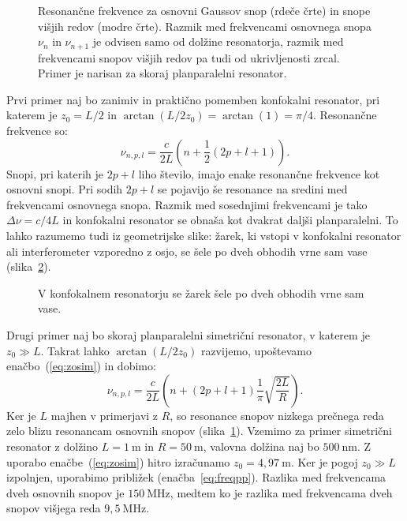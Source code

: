 \begin{figure}[ht]
\centering
\def\svgwidth{110truemm} 

\caption{Resonančne frekvence za osnovni Gaussov snop (rdeče črte) in snope višjih redov
(modre črte). Razmik med frekvencami osnovnega snopa $\nu_n$ in $\nu_{n+1}$ je odvisen 
samo od dolžine resonatorja, razmik med frekvencami snopov višjih redov pa tudi od 
ukrivljenosti zrcal. Primer je narisan za skoraj planparalelni resonator.}
\label{fig:crte}
\end{figure}
Prvi primer naj bo zanimiv in praktično pomemben konfokalni 
resonator, pri katerem je $z_{0}=L/2$ in 
$\arctan(L/2z_{0})= \arctan(1)=\pi/4$. Resonančne frekvence so:
\begin{equation}
\nu_{n,p,l}=\frac{c}{2L}\left(n+\frac{1}{2}(2p+l+1)\right)\!\!.
\label{eq:omega_konf}
\end{equation}
Snopi, pri katerih je $2p+l$ liho število, imajo enake resonančne frekvence kot
osnovni snopi. Pri sodih $2p+l$ se pojavijo še resonance na sredini
med frekvencami osnovnega snopa. Razmik med so\-sed\-nji\-mi frekvencami je tako $\Delta\nu=c/4L$
in konfokalni resonator se obnaša kot dvakrat daljši planparalelni.
To lahko razumemo tudi iz geometrijske slike: žarek, ki vstopi v konfokalni
resonator ali interferometer vzporedno z osjo, se šele po dveh obhodih vrne sam
vase (slika~\ref{fig:Konfokalni_zarek}).
\begin{figure}[ht]
\centering
\def\svgwidth{55truemm} 

\caption{V konfokalnem resonatorju se žarek šele po dveh obhodih
vrne sam vase.}
\label{fig:Konfokalni_zarek}
\end{figure}

Drugi primer naj bo skoraj planparalelni 
simetrični resonator, v katerem je $z_{0}\gg L$. Takrat lahko $\arctan(L/2z_{0})$ razvijemo, 
upoštevamo enačbo~(\ref{eq:zosim}) in dobimo:
\begin{equation}
\nu_{n,p,l}=\frac{c}{2L}\left(n+(2p+l+1)\frac{1}{\pi}\sqrt{\frac{2L}{R}}\right)\!\!.
\label{eq:freqpp}
\end{equation}
Ker je $L$ majhen v primerjavi z $R$, so resonance snopov nizkega prečnega reda 
zelo blizu resonancam osnovnih snopov (slika~\ref{fig:crte}). 
Vzemimo za primer  
simetrični resonator z dolžino $L=1~\si{\metre}$ in $R=50~\si{\metre}$, 
valovna dolžina naj bo $500~\si{\nano\metre}$. Z uporabo enačbe~(\ref{eq:zosim})
hitro izračunamo $z_0 = 4,97~\si{\metre}$. Ker je pogoj $z_0\gg L$ izpolnjen,  uporabimo
približek (enačba~\ref{eq:freqpp}). Razlika med frekvencama dveh osnovnih snopov je 
$150~\si{\mega\hertz}$, medtem ko je razlika med frekvencama dveh snopov višjega reda
$9,5~\si{\mega\hertz}$.

